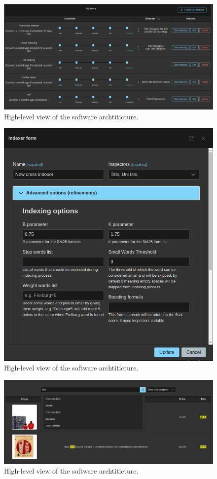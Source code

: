 \begin{figure}[h]	
     \centering
     \includegraphics[width=13cm]{images/demo-10.png}
     \caption{High-level view of the software archtiticture.}
     \label{fig:software-arch}
\end{figure}

\begin{figure}[h]	
     \centering
     \includegraphics[width=13cm]{images/demo-11.png}
     \caption{High-level view of the software archtiticture.}
     \label{fig:software-arch}
\end{figure}

\begin{figure}[h]	
     \centering
     \includegraphics[width=13cm]{images/demo-12.png}
     \caption{High-level view of the software archtiticture.}
     \label{fig:software-arch}
\end{figure}